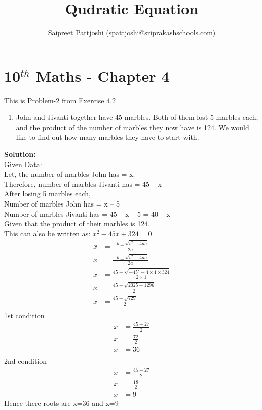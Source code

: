 \documentclass[12pt]{article}
\title{Qudratic Equation}
\author{Saipreet Pattjoshi (spattjoshi@sriprakashschools.com)}
\newcommand{\solution}{\noindent \textbf{Solution: }}
\begin{document}
\maketitle
\section*{10$^{th}$ Maths - Chapter 4}
This is Problem-2 from Exercise 4.2
\begin{enumerate}
\item John and Jivanti together have 45 marbles. Both of them lost 5 marbles each, and the product of the number of marbles they now have is 124. We would like to find out how many marbles they have to start with.
\end{enumerate}
\solution \\
Given Data:\\
Let, the number of marbles John has = x.\\
Therefore, number of marbles Jivanti has = 45 – x\\
After losing 5 marbles each,\\
Number of marbles John has = x – 5\\
Number of marbles Jivanti has = 45 – x – 5 = 40 – x\\
Given that the product of their marbles is 124.\\
This can also be written as:
${x^2-45x+324=0}$ \\
\begin{align}
x &=\frac{-b\pm\sqrt{b^2-4ac}}{2a}\\
x &=\frac{-b\pm\sqrt{b^2-4ac}}{2a}\\
x &=\frac{45\pm\sqrt{-45^2-4 \times 1\times324}}{2 \times 1}\\
x &=\frac{45+\sqrt{2025-1296}}{2}\\
x &=\frac{45+\sqrt{729}}{2}\\
\end{align}
1st condition\\
\begin{align}
x &=\frac{45+27}{2}\\
x &=\frac{72}{2}\\
x &=36\\
\end{align}
2nd condition\\
\begin{align}
x &=\frac{45-27}{2}\\
x &=\frac{18}{2}\\
x &=9
\end{align}
Hence there roots are x=36 and x=9
\end{document}
